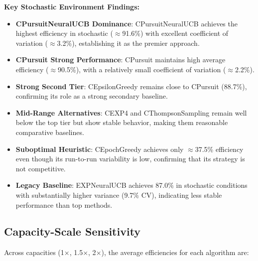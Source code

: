 \documentclass[12pt,a4paper]{article}
\newcommand{\stochastic}[1]{\textcolor{stochasticcolor}{\textbf{#1}}}
\newcommand{\critical}[1]{\textcolor{criticalcolor}{\textbf{#1}}}
\newcommand{\legacy}[1]{\textcolor{legacycolor}{\textbf{#1}}}
\newcommand{\neural}[1]{\textcolor{neuralcolor}{\textbf{#1}}}
\begin{document}
\begin{tcolorbox}[colback=stochasticcolor!10,colframe=stochasticcolor,title=\textbf{Stochastic Environment Deep Analysis (1$\times$–2$\times$ Capacities, T/Tb Combined)}]
\textbf{Key Stochastic Environment Findings:}
\begin{itemize}
\item \neural{CPursuitNeuralUCB Dominance}: CPursuitNeuralUCB achieves the highest efficiency in stochastic ($\approx$91.6\%) with excellent coefficient of variation ($\approx$3.2\%), establishing it as the premier approach.
\item \stochastic{CPursuit Strong Performance}: CPursuit maintains high average efficiency ($\approx$90.5\%), with a relatively small coefficient of variation ($\approx$2.2\%).
\item \stochastic{Strong Second Tier}: CEpsilonGreedy remains close to CPursuit (88.7\%), confirming its role as a strong secondary baseline.
\item \stochastic{Mid-Range Alternatives}: CEXP4 and CThompsonSampling remain well below the top tier but show stable behavior, making them reasonable comparative baselines.
\item \critical{Suboptimal Heuristic}: CEpochGreedy achieves only $\approx$37.5\% efficiency even though its run-to-run variability is low, confirming that its strategy is not competitive.
\item \legacy{Legacy Baseline}: EXPNeuralUCB achieves 87.0\% in stochastic conditions with substantially higher variance (9.7\% CV), indicating less stable performance than top methods.
\end{itemize}

\end{tcolorbox}

\subsection{Capacity-Scale Sensitivity}

Across capacities (1$\times$, 1.5$\times$, 2$\times$), the average efficiencies for each algorithm are:
\end{document}
